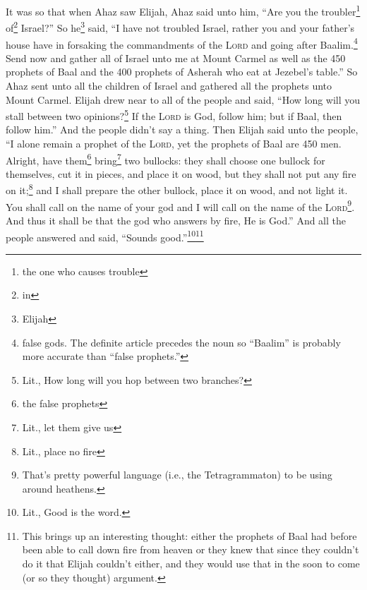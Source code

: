 
\begin{enumerate*}[mode=unboxed]
     It was so that when Ahaz saw Elijah, Ahaz said unto him, ``Are you the troubler\footnote{the one who causes trouble} of\footnote{in} Israel?''%
     So he\footnote{Elijah} said, ``I have not troubled Israel, rather you and your father's house have in forsaking the commandments of the \textsc{Lord} and going after Baalim.\footnote{false gods. The definite article precedes the noun so ``Baalim'' is probably more accurate than ``false prophets.''}%
     Send now and gather all of Israel unto me at Mount Carmel as well as the 450 prophets of Baal and the 400 prophets of Asherah who eat at Jezebel's table.''%
     So Ahaz sent unto all the children of Israel and gathered all the prophets unto Mount Carmel.%
     Elijah drew near to all of the people and said, ``How long will you stall between two opinions?\footnote{Lit., How long will you hop between two branches?} If the \textsc{Lord} is God, follow him; but if Baal, then follow him.'' And the people didn't say a thing.%
     Then Elijah said unto the people, ``I alone remain a prophet of the \textsc{Lord}, yet the prophets of Baal are 450 men.%
     Alright, have them\footnote{the false prophets} bring\footnote{Lit., let them give us} two bullocks: they shall choose one bullock for themselves, cut it in pieces, and place it on wood, but they shall not put any fire on it;\footnote{Lit., place no fire} and I shall prepare the other bullock, place it on wood, and not light it.%
     You shall call on the name of your god and I will call on the name of the \textsc{Lord}\footnote{That's pretty powerful language (i.e., the Tetragrammaton) to be using around heathens.}. And thus it shall be that the god who answers by fire, He is God.'' And all the people answered and said, ``Sounds good.''\footnote{Lit., Good is the word.}\footnote{This brings up an interesting thought: either the prophets of Baal had before been able to call down fire from heaven or they knew that since they couldn't do it that Elijah couldn't either, and they would use that in the soon to come (or so they thought) argument.}%

\end{enumerate*}
